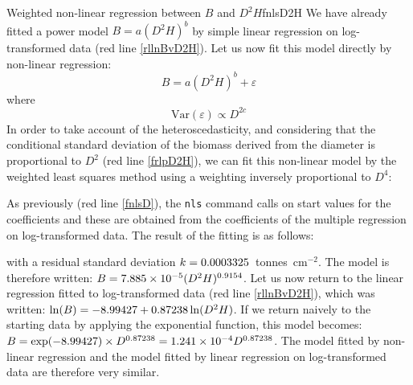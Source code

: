 \begin{filrouge}{Weighted non-linear regression between $B$ and $D^2H$}{fnlsD2H}%
We have already fitted a power model $B=a(D^2H)^b$ by simple linear regression on log-transformed data (red line \ref{rllnBvD2H}). Let us now fit this model directly by non-linear regression:
\[
B=a(D^2H)^b+\varepsilon
\]
where
\[
\mathrm{Var}(\varepsilon)\propto D^{2c}
\]
In order to take account of the heteroscedasticity, and considering that the conditional standard deviation of the biomass derived from the diameter is proportional to $D^2$ (red line \ref{frlpD2H}), we can fit this non-linear model by the weighted least squares method using a weighting inversely proportional to $D^4$:

%
As previously (red line \ref{fnlsD}), the \texttt{nls} command calls on start values for the coefficients and these are obtained from the coefficients of the multiple regression on log-transformed data. The result of the fitting is as follows:

%
with a residual standard deviation 
$k=\mbox{0.0003325}$~tonnes~cm$^{-2}$. The model is therefore written:
$B=\mbox{7.885}\times10^{-5}(D^2H)^{0.9154}$. Let us now return to the linear regression fitted to log-transformed data (red line \ref{rllnBvD2H}), which was written:
$\ln(B)=-\mbox{8.99427}+\mbox{0.87238}\ln(D^2H)$.
If we return naively to the starting data by applying the exponential function, this model becomes: 
$B=\exp(-\mbox{8.99427})\times
D^{0.87238}=\mbox{1.241}\times10^{-4}D^{0.87238}$. 
The model fitted by non-linear regression and the model fitted by linear regression on log-transformed data are therefore very similar.
\end{filrouge}

